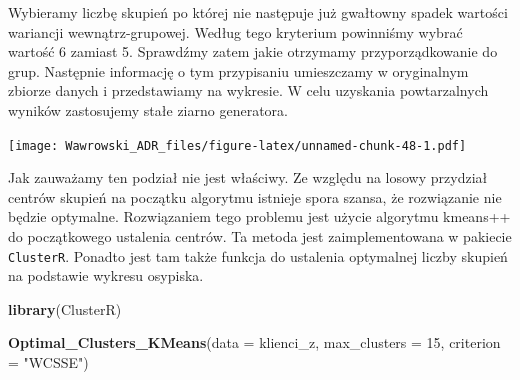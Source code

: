 \documentclass[]{book}
\newenvironment{Shaded}{\begin{snugshade}}{\end{snugshade}}
\newcommand{\DataTypeTok}[1]{\textcolor[rgb]{0.13,0.29,0.53}{#1}}
\newcommand{\DecValTok}[1]{\textcolor[rgb]{0.00,0.00,0.81}{#1}}
\newcommand{\KeywordTok}[1]{\textcolor[rgb]{0.13,0.29,0.53}{\textbf{#1}}}
\newcommand{\NormalTok}[1]{#1}
\newcommand{\OperatorTok}[1]{\textcolor[rgb]{0.81,0.36,0.00}{\textbf{#1}}}
\newcommand{\StringTok}[1]{\textcolor[rgb]{0.31,0.60,0.02}{#1}}
\begin{document}
Wybieramy liczbę skupień po której nie następuje już gwałtowny spadek wartości wariancji wewnątrz-grupowej. Według tego kryterium powinniśmy wybrać wartość 6 zamiast 5. Sprawdźmy zatem jakie otrzymamy przyporządkowanie do grup. Następnie informację o tym przypisaniu umieszczamy w oryginalnym zbiorze danych i przedstawiamy na wykresie. W celu uzyskania powtarzalnych wyników zastosujemy stałe ziarno generatora.

\begin{Shaded}
\end{Shaded}

\texttt{[image: Wawrowski\_ADR\_files/figure-latex/unnamed-chunk-48-1.pdf]}

Jak zauważamy ten podział nie jest właściwy. Ze względu na losowy przydział centrów skupień na początku algorytmu istnieje spora szansa, że rozwiązanie nie będzie optymalne. Rozwiązaniem tego problemu jest użycie algorytmu kmeans++ do początkowego ustalenia centrów. Ta metoda jest zaimplementowana w pakiecie \texttt{ClusterR}. Ponadto jest tam także funkcja do ustalenia optymalnej liczby skupień na podstawie wykresu osypiska.

\begin{Shaded}
\begin{Highlighting}[]
\KeywordTok{library}\NormalTok{(ClusterR)}

\KeywordTok{Optimal_Clusters_KMeans}\NormalTok{(}\DataTypeTok{data =}\NormalTok{ klienci_z, }\DataTypeTok{max_clusters =} \DecValTok{15}\NormalTok{, }\DataTypeTok{criterion =} \StringTok{"WCSSE"}\NormalTok{)}
\end{Highlighting}
\end{Shaded}
\end{document}
